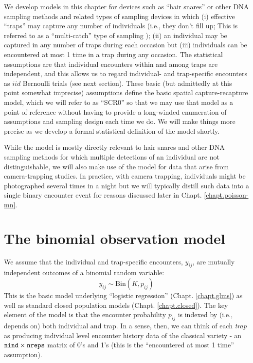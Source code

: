 We develop models in this chapter for devices such as ``hair snares''
or other DNA sampling methods \citep{kery_etal:2010,
  gardner_etal:2010jwm} and related types of sampling devices in which
(i) effective ``traps'' may capture any number of individuals (i.e.,
they don't fill up; This is referred to as a ``multi-catch'' type of
sampling \citep{efford_etal:2009ecol}); (ii) an individual may be
captured in any number of traps during each occasion but (iii)
individuals can be encountered at most 1 time in a trap during any
occasion.  The statistical assumptions are that individual encounters
within and among traps are independent, and this allows us to regard
individual- and trap-specific encounters as $iid$ Bernoulli trials
(see next section).  These basic (but admittedly at this point
somewhat imprecise) assumptions define the basic spatial
capture-recapture model, which we will refer to as ``SCR0'' 
so that we may use that model as a point of reference without having
to provide a long-winded enumeration of assumptions and sampling
design each time we do. We will make things more precise as we develop
a formal statistical definition of the model shortly.

While the model is mostly directly relevant
to hair snares and other DNA sampling methods for which multiple
detections of an individual are not distinguishable,
we will also make use of the model for data that arise from
camera-trapping studies. In practice, with camera trapping,
individuals might be photographed several times in a night but we will
typically distill such data into a single binary encounter event for
reasons discussed later in Chapt. \ref{chapt.poisson-mn}.


\section{The binomial observation model }

We assume that the individual and trap-specific encounters, $y_{ij}$,
are mutually independent outcomes of a binomial random variable:
\begin{equation}
	y_{ij} \sim \mbox{Bin}(K, p_{ij})
\label{scr0.eq.bin}
\end{equation}
This is the basic model underlying ``logistic regression'' (Chapt. \ref{chapt.glms})
as well as standard closed population models
(Chapt. \ref{chapt.closed}). The key
element of the model is that the encounter probability $p_{ij}$ is
indexed by (i.e., depends on) both individual and trap. In a sense,
then, we can think of each {\it trap} as producing individual level
encounter history data of the classical variety - an $\mbox{\tt nind}
\times \mbox{\tt nreps}$
matrix of 0's and 1's (this is the ``encountered at most 1 time''
assumption).


